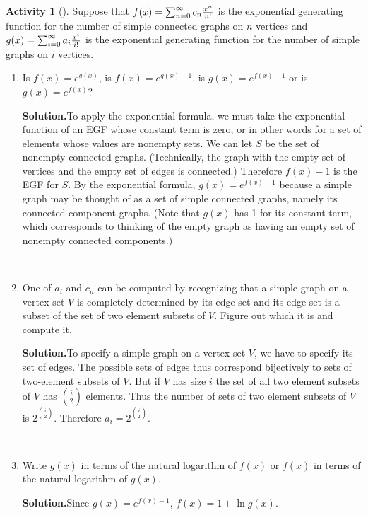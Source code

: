 \documentclass[10pt,]{book}
\theoremstyle{plain}
\theoremstyle{definition}
\newtheorem{activity}[project]{Activity}
\numberwithin{equation}{chapter}
\begin{document}
\begin{activity}[]\label{activity-121}
Suppose that \(f(x) = \sum_{n=0}^\infty c_n {x^n\over n!}\) is the exponential generating function for the number of simple connected graphs on \(n\) vertices and \(g(x) = \sum_{i=0}^\infty a_i {x^i\over i!}\) is the exponential generating function for the number of simple graphs on \(i\) vertices.%
~\par
\begin{enumerate}[label=(\alph*)]
 \item Is \(f(x) = e^{g(x)}\), is \(f(x) = e^{g(x)-1}\), is \(g(x) = e^{f(x)-1}\) or is \(g(x) = e^{f(x)}\)?%
\par\medskip\noindent%
\textbf{Solution.}\quad To apply the exponential formula, we must take the exponential function of an EGF whose constant term is zero, or in other words for a set of elements whose values are nonempty sets. We can let \(S\) be the set of nonempty connected graphs. (Technically, the graph with the empty set of vertices and the empty set of edges is connected.) Therefore \(f(x) -1\) is the EGF for \(S\). By the exponential formula, \(g(x)=e^{f(x)-1}\) because a simple graph may be thought of as a set of simple connected graphs, namely its connected component graphs. (Note that \(g(x)\) has 1 for its constant term, which corresponds to thinking of the empty graph as having an empty set of nonempty connected components.)%

~\par
\item One of \(a_i\) and \(c_n\) can be computed by recognizing that a simple graph on a vertex set \(V\) is completely determined by its edge set and its edge set is a subset of the set of two element subsets of \(V\). Figure out which it is and compute it.%
\par\medskip\noindent%
\textbf{Solution.}\quad To specify a simple graph on a vertex set \(V\), we have to specify its set of edges. The possible sets of edges thus correspond bijectively to sets of two-element subsets of \(V\). But if \(V\) has size \(i\) the set of all two element subsets of \(V\) has \(i\choose 2\) elements. Thus the number of sets of two element subsets of \(V\) is \(2^{i\choose
2}\). Therefore \(a_i = 2^{i\choose 2}\).%

~\par
\item Write \(g(x)\) in terms of the natural logarithm of \(f(x)\) or \(f(x)\) in terms of the natural logarithm of  \(g(x)\).%
\par\medskip\noindent%
\textbf{Solution.}\quad Since \(g(x) = e^{f(x)-1}\), \(f(x) = 1+ \ln g(x)\).%


\end{enumerate}
\end{activity}
\end{document}
